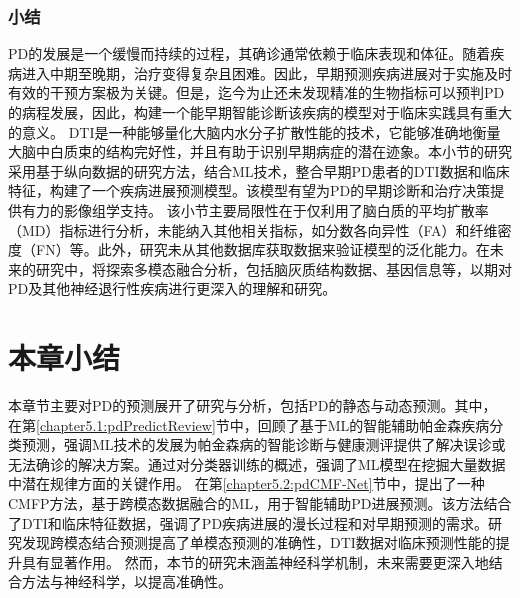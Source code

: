 \subsubsection{小结}
PD的发展是一个缓慢而持续的过程，其确诊通常依赖于临床表现和体征。随着疾病进入中期至晚期，治疗变得复杂且困难。因此，早期预测疾病进展对于实施及时有效的干预方案极为关键。但是，迄今为止还未发现精准的生物指标可以预判PD的病程发展，因此，构建一个能早期智能诊断该疾病的模型对于临床实践具有重大的意义。
DTI是一种能够量化大脑内水分子扩散性能的技术，它能够准确地衡量大脑中白质束的结构完好性，并且有助于识别早期病症的潜在迹象。本小节的研究采用基于纵向数据的研究方法，结合ML技术，整合早期PD患者的DTI数据和临床特征，构建了一个疾病进展预测模型。该模型有望为PD的早期诊断和治疗决策提供有力的影像组学支持。
该小节主要局限性在于仅利用了脑白质的平均扩散率（MD）指标进行分析，未能纳入其他相关指标，如分数各向异性（FA）和纤维密度（FN）等。此外，研究未从其他数据库获取数据来验证模型的泛化能力。在未来的研究中，将探索多模态融合分析，包括脑灰质结构数据、基因信息等，以期对PD及其他神经退行性疾病进行更深入的理解和研究。




\section{本章小结}
本章节主要对PD的预测展开了研究与分析，包括PD的静态与动态预测。其中，
在第\ref{chapter5.1:pdPredictReview}节中，回顾了基于ML的智能辅助帕金森疾病分类预测，强调ML技术的发展为帕金森病的智能诊断与健康测评提供了解决误诊或无法确诊的解决方案。通过对分类器训练的概述，强调了ML模型在挖掘大量数据中潜在规律方面的关键作用。
在第\ref{chapter5.2:pdCMF-Net}节中，提出了一种CMFP方法，基于跨模态数据融合的ML，用于智能辅助PD进展预测。该方法结合了DTI和临床特征数据，强调了PD疾病进展的漫长过程和对早期预测的需求。研究发现跨模态结合预测提高了单模态预测的准确性，DTI数据对临床预测性能的提升具有显著作用。
然而，本节的研究未涵盖神经科学机制，未来需要更深入地结合方法与神经科学，以提高准确性。


